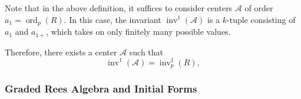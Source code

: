 \documentclass{amsart}
\newcommand{\cA}{{\mathcal A}}
\newcommand{\inv}{{\operatorname{inv}}}
\begin{document}
Note that in the above definition, it suffices to consider centers \( \mathcal{A} \) of order \( a_1 = \operatorname{ord}_p(R) \). In this case, the invariant \( \inv^1(\mathcal{A}) \) is a \( k \)-tuple consisting of \( a_1 \) and  \( a_{1+} \), which takes on only finitely many possible values. 

Therefore, there exists a center \( \mathcal{A} \) such that
\[
\inv^1(\mathcal{A}) = \inv^1_p(R),
\]

\subsubsection{Graded Rees Algebra and Initial Forms}
\end{document}

